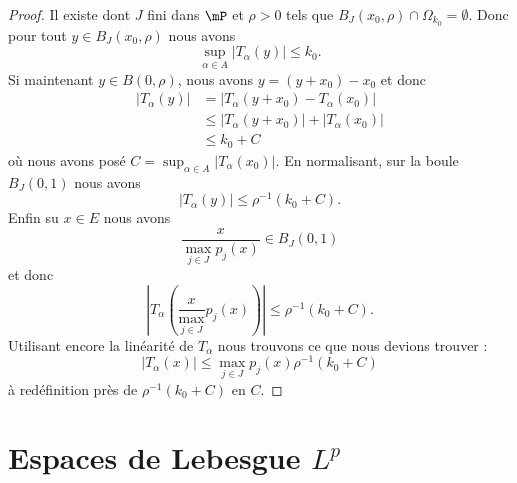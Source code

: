 \begin{proof}
    Il existe dont \( J\) fini dans \( \mP\) et \( \rho>0\) tels que \( B_J(x_0,\rho)\cap\Omega_{k_0}=\emptyset\). Donc pour tout \( y\in B_J(x_0,\rho)\) nous avons
    \begin{equation}
        \sup_{\alpha\in A}\big| T_{\alpha}(y) \big|\leq k_0.
    \end{equation}
    Si maintenant \( y\in B(0,\rho)\), nous avons \( y=(y+x_0)-x_0\) et donc
    \begin{subequations}
        \begin{align}
            \big| T_{\alpha}(y) \big|&=\big| T_{\alpha}(y+x_0)-T_{\alpha}(x_0) \big|\\
            &\leq \big| T_{\alpha}(y+x_0) \big|+\big| T_{\alpha}(x_0) \big|\\
            &\leq k_0+C
        \end{align}
    \end{subequations}
    où nous avons posé \( C=\sup_{\alpha\in A}\big| T_{\alpha}(x_0) \big|\). En normalisant, sur la boule \( B_J(0,1)\) nous avons
    \begin{equation}
        \big| T_{\alpha}(y) \big|\leq \rho^{-1}(k_0+C).
    \end{equation}
    Enfin su \( x\in E\) nous avons
    \begin{equation}
        \frac{ x }{ \max_{j\in J}p_j(x) }\in B_J(0,1)
    \end{equation}
    et donc
    \begin{equation}
        \left| T_{\alpha}\left( \frac{ x }{ \max_{j\in J} }p_j(x) \right) \right| \leq \rho^{-1}(k_0+C).
    \end{equation}
    Utilisant encore la linéarité de \( T_{\alpha}\) nous trouvons ce que nous devions trouver :
    \begin{equation}
        \big| T_{\alpha}(x) \big|\leq \max_{j\in J}p_j(x)\rho^{-1}(k_0+C)
    \end{equation}
    à redéfinition près de \( \rho^{-1}(k_0+C)\) en \( C\).
\end{proof}

\section{Espaces de Lebesgue \texorpdfstring{$L^p$}{Lp}}
\label{SecVKiVIQK}

